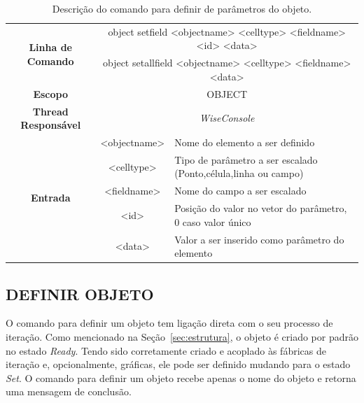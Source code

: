 \begin{center}
	\begin{table}[!htbp]
		\begin{tabularx}{\textwidth}{c|c|X}
			\toprule
			\multirow{2}{*}{\textbf{Linha de Comando}} & \multicolumn{2}{X}{object set\underline{\space\space}field <object\underline{\space\space}name> <cell\underline{\space\space}type> <field\underline{\space\space}name> <id> <data>} \\
			& \multicolumn{2}{X}{object set\underline{\space\space}all\underline{\space\space}field <object\underline{\space\space}name> <cell\underline{\space\space}type> <field\underline{\space\space}name> <data>} \\
			\midrule
			\textbf{Escopo} & \multicolumn{2}{c}{OBJECT} \\
			\hline
			\textbf{Thread Responsável} & \multicolumn{2}{c}{\textit{WiseConsole}} \\
			\hline
			\multirow{5}{*}{\textbf{Entrada}} & <object\underline{\space\space}name> & Nome do elemento a ser definido \\
			& <cell\underline{\space\space}type> & Tipo de parâmetro a ser escalado (Ponto,célula,linha ou campo) \\
			& <field\underline{\space\space}name> & Nome do campo a ser escalado \\
			& <id> & Posição do valor no vetor do parâmetro, 0 caso valor único \\
			& <data> & Valor a ser inserido como parâmetro do elemento \\
			\bottomrule
		\end{tabularx}
		\caption{Descrição do comando para definir de parâmetros do objeto.}
		\label{tab:set_field_object}
	\end{table}
\end{center}

\subsection{DEFINIR OBJETO}\label{sec:set_object}

O comando para definir um objeto tem ligação direta com o seu processo de iteração. Como mencionado na Seção~\ref{sec:estrutura}, o objeto é criado por padrão no estado \textit{Ready}. Tendo sido corretamente criado e acoplado às fábricas de iteração e, opcionalmente, gráficas, ele pode ser definido mudando para o estado \textit{Set}. O comando para definir um objeto recebe apenas o nome do objeto e retorna uma mensagem de conclusão.

